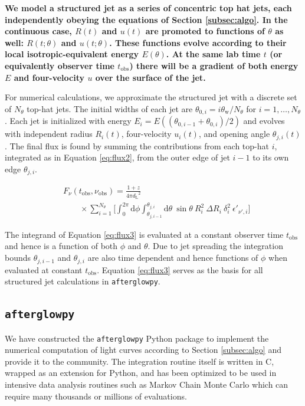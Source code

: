 \documentclass[twocolumn]{aastex62}
\newcommand{\afterglowpy}{{\tt afterglowpy}}
\newcommand{\dd}{\ensuremath{\mathrm{d}}}
\newcommand{\tobs}{\ensuremath{t_{\mathrm{obs}}}}
\newcommand{\nuobs}{\ensuremath{\nu_{\mathrm{obs}}}}
\newcommand{\thW}{\ensuremath{\theta_{\mathrm{w}}}}
\newcommand{\dL}{\ensuremath{d_{\mathrm{L}}}}
\begin{document}
{\bf
We model a structured jet as a series of concentric top hat jets, each independently obeying the equations of Section \ref{subsec:algo}.  In the continuous case, $R(t)$ and $u(t)$ are promoted to functions of $\theta$ as well: $R(t; \theta)$ and $u(t; \theta)$.  These functions evolve according to their local isotropic-equivalent energy $E(\theta)$.   At the same lab time $t$ (or equivalently observer time $\tobs$) there will be a gradient of both energy $E$ and four-velocity $u$ over the surface of the jet.

For numerical calculations, we approximate the structured jet with a discrete set of $N_\theta$ top-hat jets.  The initial widths of each jet are $\theta_{0, i} = i \thW / N_\theta$ for $i = 1, \dots, N_\theta$.  Each jet is initialized with energy $E_i = E((\theta_{0, i-1} + \theta_{0,i})/2)$ and evolves with independent radius $R_i(t)$, four-velocity $u_i(t)$, and opening angle $\theta_{j, i}(t)$.  The final flux is found by summing the contributions from each top-hat $i$, integrated as in Equation \eqref{eq:flux2}, from the outer edge of jet $i-1$ to its own edge $\theta_{j, i}$.

\begin{align}
		&F_\nu(\tobs, \nuobs) = \frac{1+z}{4\pi \dL^2}  \label{eq:flux3} \\
		&\qquad \times \sum_{i=1}^{N_\theta}  \Bigg [ \int_0^{2\pi} \!\!\! \dd \phi   \int_{\theta_{j, i-1}}^{\theta_{j, i}} \!\!\! \dd \theta \ \sin \theta\  R_i^2\ \Delta R_i\  \delta_i^2\ \epsilon'_{\nu', i} \Bigg ] \nonumber
\end{align}

The integrand of Equation \eqref{eq:flux3} is evaluated at a constant observer time $\tobs$ and hence is a function of both $\phi$ and $\theta$.  Due to jet spreading the integration bounds $\theta_{j, i-1}$ and $\theta_{j, i}$ are also time dependent and hence functions of $\phi$ when evaluated at constant $\tobs$. Equation \eqref{eq:flux3} serves as the basis for all structured jet calculations in \afterglowpy{}.
}

\subsection{\afterglowpy{}} \label{subsec:afterglowpy}


We have constructed the \afterglowpy{} Python package to implement the numerical computation of light curves according to Section \ref{subsec:algo} and provide it to the community.  The integration routine itself is written in C, wrapped as an extension for Python, and has been optimized to be used in intensive data analysis routines such as Markov Chain Monte Carlo which can require many thousands or millions of evaluations.  
\end{document}
